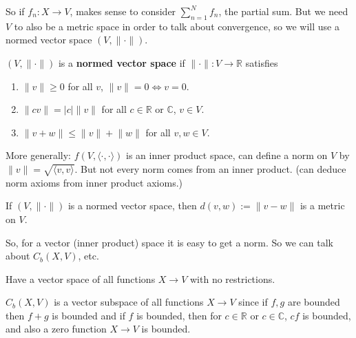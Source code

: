 So if \(f_n: X \to V\), makes sense to consider \(\sum_{n=1}^N f_n\), the partial sum. But we need \(V\) to also be a metric space in order to talk about convergence, so we will use a normed vector space \((V, \lVert \cdot \rVert)\). 


\begin{definition}

\((V, \lVert \cdot \rVert)\) is a \textbf{normed vector space} if \(\lVert \cdot \rVert: V \to \mathbb{R}\) satisfies

\begin{enumerate}

\item \(\lVert v \rVert \geq 0\) for all \(v\), \(\lVert v \rVert = 0 \iff v = 0\).

\item \(\lVert cv \rVert = |c| \lVert v \rVert\) for all \(c \in \mathbb{R} \) or \(\mathbb{C}\), \(v \in V\).

\item \(\lVert v +w  \rVert \leq \lVert v \rVert + \lVert w \rVert\) for all \(v, w \in V\).

\end{enumerate}

\end{definition}

More generally: \(f(V, \langle \cdot, \cdot \rangle)\) is an inner product space, can define a norm on \(V\) by \(\lVert v \rVert = \sqrt{ \langle v, v \rangle}\). But not every norm comes from an inner product. (can deduce norm axioms from inner product axioms.)

\begin{exercise}

If \((V, \lVert \cdot \rVert)\) is a normed vector space, then \(d(v,w) := \lVert v - w \rVert\) is a metric on \(V\).

\end{exercise}

So, for a vector (inner product) space it is easy to get a norm. So we can talk about \(C_b(X, V)\), etc.

Have a vector space of all functions \(X \to V\) with no restrictions. 

\begin{exercise}

\(C_b(X, V)\) is a vector subspace of all functions \(X \to V\) since if \(f, g\) are bounded then \(f + g\) is bounded and if \(f\) is bounded, then for \(c \in \mathbb{R}\) or \(c \in \mathbb{C}\), \(cf\) is bounded, and also a zero function \(X \to V\) is bounded.

\end{exercise}

